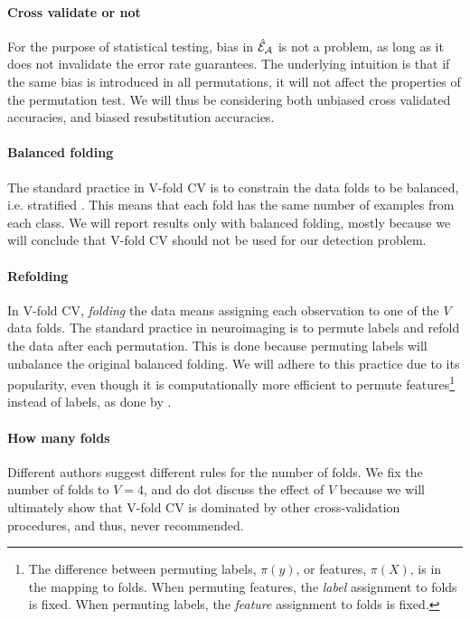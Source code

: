 \documentclass[]{bio}
\begin{document}
\paragraph{Cross validate or not}
For the purpose of statistical testing, bias in $\hat{\mathcal{E}}_{\mathcal{A}}$ is not a problem, as long as it does not invalidate the error rate guarantees. 
The underlying intuition is that if the same bias is introduced in all permutations, it will not affect the properties of the permutation test. 
We will thus be considering both unbiased cross validated accuracies, and biased resubstitution accuracies.


\paragraph{Balanced folding}
The standard practice in V-fold CV is to constrain the data folds to be balanced, i.e. stratified \cite[for e.g.]{ojala_permutation_2010}.
This means that each fold has the same number of examples from each class. 
We will report results only with balanced folding, mostly because we will conclude that V-fold CV should not be used for our detection problem. 


\paragraph{Refolding}
In V-fold CV, \emph{folding} the data means assigning each observation to one of the $V$ data folds. 
The standard practice in neuroimaging is to permute labels and refold the data after each permutation. 
This is done because permuting labels will unbalance the original balanced folding.
We will adhere to this practice due to its popularity, even though it is computationally more efficient to permute features\footnote{The difference between permuting labels, $\pi(y)$, or features, $\pi(X)$, is in the mapping to folds. When permuting features, the \textit{label} assignment to folds is fixed. When permuting labels, the \textit{feature} assignment to folds is fixed.} instead of labels, as done by \cite{golland_permutation_2005}.


\paragraph{How many folds}
Different authors suggest different rules for the number of folds. 
We fix the number of folds to $V=4$, and do dot discuss the effect of $V$ because we will ultimately show that V-fold CV is dominated by other cross-validation procedures, and thus, never recommended. 
\end{document}
